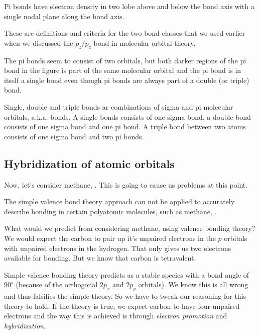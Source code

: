 \documentclass[../mit-general-chemistry.tex]{subfiles}
\begin{document}
Pi bonds have electron density in two lobe above and below the bond
axis with a single nodal plane along the bond axis.

These are definitions and criteria for the two bond classes that we
used earlier when we discussed the $p_z/p_z$ bond in molecular orbital
theory.

The pi bonds seem to consist of two orbitals, but both darker regions
of the pi bond in the figure is part of the same molecular orbital and
the pi bond is in itself a single bond even though pi bonds are always
part of a double (or triple) bond.

Single, double and triple bonds ar combinations of sigma and pi
molecular orbitals, a.k.a. bonds. A single bonds consists of one sigma
bond, a double bond consists of one sigma bond and one pi bond. A
triple bond between two atoms consists of one sigma bond and two pi
bonds.



\subsection{Hybridization of atomic orbitals}



Now, let's consider methane, . This is going to cause us
problems at this point.

The simple valence bond theory approach can not be applied to
accurately describe bonding in certain polyatomic molecules, such as
methane, .


\begin{center}
  \begin{MOdiagram}[names,labels,labels-fs=\footnotesize]
    \EnergyAxis[title=$E$]
  \end{MOdiagram}
\end{center}


What would we predict from considering methane, using valence bonding
theory? We would expect the carbon to pair up it's unpaired electrons
in the $p$ orbitals with unpaired electrons in the hydrogen. That only
gives us two electrons available for bonding. But we know that carbon
is tetravalent.

Simple valence bonding theory predicts  as a stable species
with a bond  angle of $90^{\circ}$ (because of the
orthogonal $2p_x$ and $2p_y$ orbitals). We know this is all wrong and
thus falsifies the simple theory. So we have to tweak our reasoning
for this theory to hold.  If the theory is true, we expect carbon to
have four unpaired electrons and the way this is achieved is through
{\em electron promotion} and {\em hybridization}.
\end{document}
